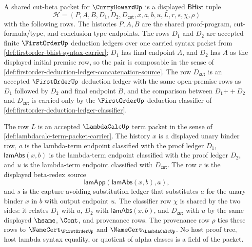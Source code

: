 \begin{definition}\label{def:curryhoward-shared-cut-beta-packet}
A shared cut-beta packet for $\CurryHowardUp$ is a displayed $\mathsf{BHist}$ tuple
$$
\mathcal H=(P,A,B,D_1,D_2,D_{\mathsf{cut}},x,a,b,u,L,r,s,\chi,\rho)
$$
with the following rows. The histories $P,A,B$ are the shared proof-program, cut-formula/type, and conclusion-type endpoints. The rows $D_1$ and $D_2$ are accepted finite $\FirstOrderUp$ deduction ledgers over one carried syntax packet from \autoref{def:firstorder-bhist-syntax-carrier}; $D_1$ has final endpoint $A$, and $D_2$ has $A$ as the displayed initial premise row, so the pair is composable in the sense of \autoref{def:firstorder-deduction-ledger-concatenation-source}. The row $D_{\mathsf{cut}}$ is an accepted $\FirstOrderUp$ deduction ledger with the same open-premise rows as $D_1$ followed by $D_2$ and final endpoint $B$, and the comparison between $D_1 \mathbin{+\!\!+} D_2$ and $D_{\mathsf{cut}}$ is carried only by the $\FirstOrderUp$ deduction classifier of \autoref{def:firstorder-deduction-ledger-classifier}.

The row $L$ is an accepted $\LambdaCalcUp$ term packet in the sense of \autoref{def:lambdacalc-term-packet-carrier}. The history $x$ is a displayed unary binder row, $a$ is the lambda-term endpoint classified with the proof ledger $D_1$, $\mathsf{lamAbs}(x,b)$ is the lambda-term endpoint classified with the proof ledger $D_2$, and $u$ is the lambda-term endpoint classified with $D_{\mathsf{cut}}$. The row $r$ is the displayed beta-redex source
$$
\mathsf{lamApp}(\mathsf{lamAbs}(x,b),a),
$$
and $s$ is the capture-avoiding substitution ledger that substitutes $a$ for the unary binder $x$ in $b$ with output endpoint $u$. The classifier row $\chi$ is shared by the two sides: it relates $D_1$ with $a$, $D_2$ with $\mathsf{lamAbs}(x,b)$, and $D_{\mathsf{cut}}$ with $u$ by the same displayed $\hsame$, $\Cont$, and provenance rows. The provenance row $\rho$ ties these rows to $\NameCert_{\FirstOrderUp}$ and $\NameCert_{\LambdaCalcUp}$. No host proof tree, host lambda syntax equality, or quotient of alpha classes is a field of the packet.
\end{definition}

